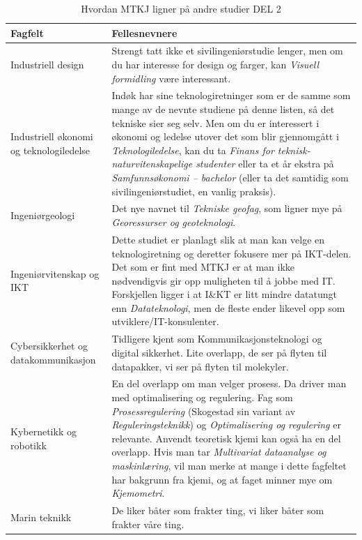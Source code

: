 \begin{table}[H]
    \centering
    \begin{tabular}{p{3cm}p{10cm}}
        \toprule
        Fagfelt & Fellesnevnere \\
        \midrule
        Industriell design & Strengt tatt ikke et sivilingeniørstudie lenger, men om du har interesse for design og farger, kan \textit{Visuell formidling} være interessant. \\
        
        Industriell økonomi og teknologiledelse & Indøk har sine teknologiretninger som er de samme som mange av de nevnte studiene på denne listen, så det tekniske sier seg selv. Men om du er interessert i økonomi og ledelse utover det som blir gjennomgått i \textit{Teknologiledelse}, kan du ta \textit{Finans for teknisk-naturvitenskapelige studenter} eller ta et år ekstra på \textit{Samfunnsøkonomi – bachelor} (eller ta det samtidig som sivilingeniørstudiet, en vanlig praksis). \\
        
        Ingeniørgeologi & Det nye navnet til \textit{Tekniske geofag}, som ligner mye på \textit{Georessurser og geoteknologi}. \\
        
        Ingeniørvitenskap og IKT & Dette studiet er planlagt slik at man kan velge en teknologiretning og deretter fokusere mer på IKT-delen. Det som er fint med MTKJ er at man ikke nødvendigvis gir opp muligheten til å jobbe med IT. Forskjellen ligger i at I\&KT er litt mindre datatungt enn \textit{Datateknologi}, men de fleste ender likevel opp som utviklere/IT-konsulenter. \\
        
        Cybersikkerhet og datakommunikasjon & Tidligere kjent som Kommunikasjonsteknologi og digital sikkerhet. Lite overlapp, de ser på flyten til datapakker, vi ser på flyten til molekyler. \\
        
        Kybernetikk og robotikk & En del overlapp om man velger prosess. Da driver man med optimalisering og regulering. Fag som \textit{Prosessregulering} (Skogestad sin variant av \textit{Reguleringsteknikk}) og \textit{Optimalisering og regulering} er relevante. Anvendt teoretisk kjemi kan også ha en del overlapp. Hvis man tar \textit{Multivariat dataanalyse og maskinlæring}, vil man merke at mange i dette fagfeltet har bakgrunn fra kjemi, og at faget minner mye om \textit{Kjemometri}. \\
        
        Marin teknikk & De liker båter som frakter ting, vi liker båter som frakter våre ting. \\
        \bottomrule
    \end{tabular}
    \caption{Hvordan MTKJ ligner på andre studier DEL 2}
    \label{tab:AndreStudierDel2}
\end{table}

